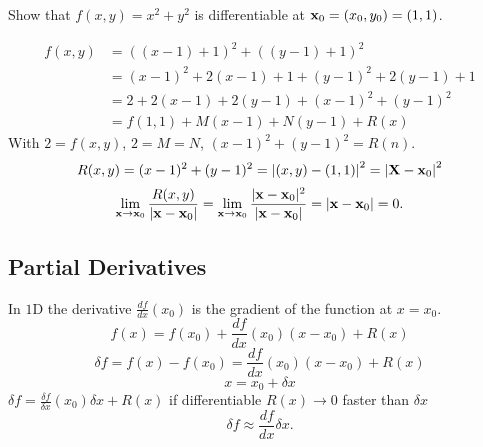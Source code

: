 \documentclass[10pt, a4paper]{article}
\begin{document}
\begin{example}
    Show that $f(x, y) = x ^ 2 + y ^ 2$ is differentiable at $\mathbf{x}_0 = (x_0, y_0) = (1, 1)$.
    \begin{solution}
        \begin{align*}
            f(x, y) &= ((x - 1) + 1) ^ 2 + ((y - 1) + 1) ^ 2 \\
            &= (x - 1) ^ 2 + 2(x - 1) + 1 + (y - 1) ^ 2 + 2(y - 1) + 1 \\
            &= 2 + 2(x - 1) + 2(y - 1) + (x - 1) ^ 2 + (y - 1) ^ 2 \\
            &= f(1, 1) + M(x - 1) + N(y - 1) + R(x)
        \end{align*}
        With $2 = f(x, y)$,
        $2 = M = N$,
        $(x - 1) ^ 2 + (y - 1) ^ 2 = R(n)$.
        \[
        R(x, y) = (x - 1) ^ 2 + (y - 1) ^ 2 = \left|(x, y) - (1, 1)\right| ^ 2 = \left|\mathbf{X} -  \mathbf{x}_0\right| ^ 2
        \]
        \[
        \lim_{\mathbf{x} \rightarrow \mathbf{x}_0}\frac{R(x, y)}{|\mathbf{x} - \mathbf{x}_0|} = 
        \lim_{\mathbf{x} \rightarrow \mathbf{x}_0}\frac{|\mathbf{x} - \mathbf{x}_0| ^ 2}{|\mathbf{x} - \mathbf{x}_0|} = |\mathbf{x} - \mathbf{x}_0| = 0.
        \]
    \end{solution}
\end{example}

\subsection{Partial Derivatives}
In $1$D the derivative $\frac{df}{dx}(x_0)$ is the gradient of the function at $x = x_0$.
\[
f(x) = f(x_0) + \frac{df}{dx}(x_0)(x - x_0) + R(x)
\]
\[
\delta f = f(x) - f(x_0) = \frac{df}{dx}(x_0)(x - x_0) + R(x)
\]
\[
x = x_0 + \delta x
\]
$\delta f = \frac{\delta f}{\delta x}(x_0)\delta x + R(x)$
if differentiable $R(x) \rightarrow 0$ faster than $\delta x$
\[
\delta f \approx \frac{df}{dx}\delta x.
\]
\end{document}
